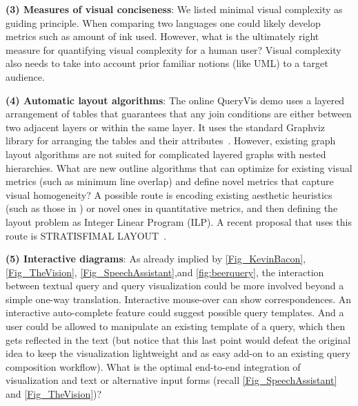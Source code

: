 \documentclass[letterpaper,11pt]{article}
\newcommand{\queryvis}{\textsf{QueryVis}\xspace}
\begin{document}
\textbf{(3) Measures of visual conciseness}: 
We listed minimal visual complexity as guiding principle. 
When comparing two languages one could likely develop metrics such as amount of ink used.
However, what is the ultimately right measure for quantifying visual complexity for a human user?
Visual complexity also needs to take into account prior familiar notions (like UML) to a target audience.






\textbf{(4) Automatic layout algorithms}:
The online \queryvis demo uses a layered arrangement of tables that guarantees that any join conditions
are either between two adjacent layers or within the same layer.
It uses the standard Graphviz library for arranging the tables and their attributes~\cite{Ellson03graphvizand}.
However, existing graph layout algorithms are not suited for complicated layered graphs with nested hierarchies.
What are new outline algorithms that can optimize for existing visual metrics (such as minimum line overlap) 
and define novel metrics that capture visual homogeneity?
A possible route is 
encoding existing aesthetic heuristics (such as those in \cite[Table 1]{DBLP:conf/cae/BennettRSG07})
or novel ones
in quantitative metrics, and then
defining the layout problem as Integer Linear Program (ILP). 
A recent proposal that uses this route is STRATISFIMAL LAYOUT~\cite{DBLP:journals/tvcg/BartolomeoRGD22}.







\textbf{(5) Interactive diagrams}:
As already implied by \autoref{Fig_KevinBacon},
\autoref{Fig_TheVision}, 
\autoref{Fig_SpeechAssistant},and
\autoref{fig:beerquery},
the interaction between textual query and query visualization could be more involved beyond a simple one-way translation.
Interactive mouse-over can show correspondences. 
%
An interactive auto-complete feature could suggest possible query templates. 
And a user could be allowed to manipulate an existing template of a query, which then gets reflected in the text
(but notice that this last point would defeat the original idea to keep the visualization lightweight and as easy add-on to an existing query composition workflow).
What is the optimal end-to-end integration of visualization and text or alternative input forms
(recall \autoref{Fig_SpeechAssistant} and \autoref{Fig_TheVision})?


\end{document}
